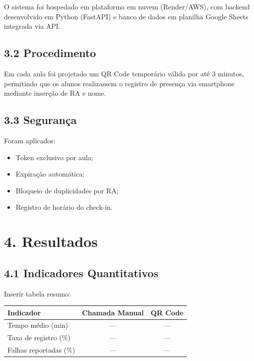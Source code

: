 \documentclass[12pt,a4paper]{article}
\begin{document}
O sistema foi hospedado em plataforma em nuvem (Render/AWS), com backend desenvolvido em Python (FastAPI) e banco de dados em planilha Google Sheets integrada via API.

\subsection*{3.2 Procedimento}

Em cada aula foi projetado um QR Code temporário válido por até 3 minutos, permitindo que os alunos realizassem o registro de presença via smartphone mediante inserção de RA e nome.

\subsection*{3.3 Segurança}

Foram aplicados:

\begin{itemize}
    \item Token exclusivo por aula;
    \item Expiração automática;
    \item Bloqueio de duplicidades por RA;
    \item Registro de horário do check-in.
\end{itemize}


\section*{4. Resultados}

\subsection*{4.1 Indicadores Quantitativos}

Inserir tabela resumo:

\begin{center}
\begin{tabular}{lcc}
\toprule
\textbf{Indicador} & \textbf{Chamada Manual} & \textbf{QR Code} \\
\midrule
Tempo médio (min) & --- & --- \\
Taxa de registro (\%) & --- & --- \\
Falhas reportadas (\%) & --- & --- \\
\bottomrule
\end{tabular}
\end{center}
\end{document}
